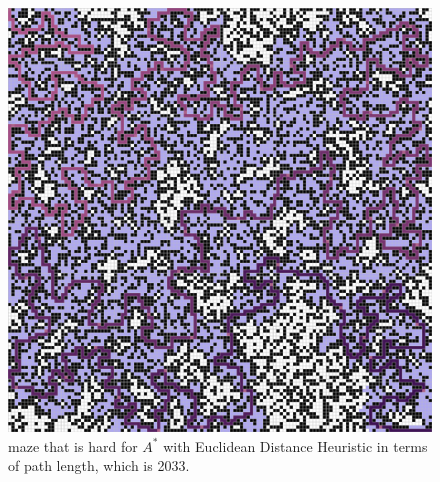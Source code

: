 \documentclass[letter]{article}
\begin{document}
\begin{enumerate}[resume]
\begin{enumerate}
\begin{enumerate}
\begin{figure}
					\includegraphics[width=\textwidth]{../pics/aep/2033.png}
					\caption{\label{fig:aep1}maze that is hard for $ A^* $ with Euclidean Distance Heuristic in terms of path length, which is 2033.}
					

\end{figure}
\end{enumerate}
\end{enumerate}
\end{enumerate}
\end{document}

